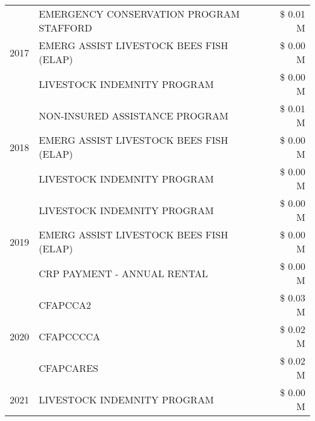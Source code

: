 \begin{tabular}{llr}
\cline{1-3}
\multirow[t]{3}{*}{2017} & EMERGENCY CONSERVATION PROGRAM STAFFORD & \$ 0.01 M \\
 & EMERG ASSIST LIVESTOCK BEES FISH (ELAP) & \$ 0.00 M \\
 & LIVESTOCK INDEMNITY PROGRAM & \$ 0.00 M \\
\cline{1-3}
\multirow[t]{3}{*}{2018} & NON-INSURED ASSISTANCE PROGRAM & \$ 0.01 M \\
 & EMERG ASSIST LIVESTOCK BEES FISH (ELAP) & \$ 0.00 M \\
 & LIVESTOCK INDEMNITY PROGRAM & \$ 0.00 M \\
\cline{1-3}
\multirow[t]{3}{*}{2019} & LIVESTOCK INDEMNITY PROGRAM & \$ 0.00 M \\
 & EMERG ASSIST LIVESTOCK BEES FISH (ELAP) & \$ 0.00 M \\
 & CRP PAYMENT - ANNUAL RENTAL & \$ 0.00 M \\
\cline{1-3}
\multirow[t]{3}{*}{2020} & CFAPCCA2 & \$ 0.03 M \\
 & CFAPCCCCA & \$ 0.02 M \\
 & CFAPCARES & \$ 0.02 M \\
\cline{1-3}
2021 & LIVESTOCK INDEMNITY PROGRAM & \$ 0.00 M \\
\cline{1-3}
\bottomrule
\end{tabular}
